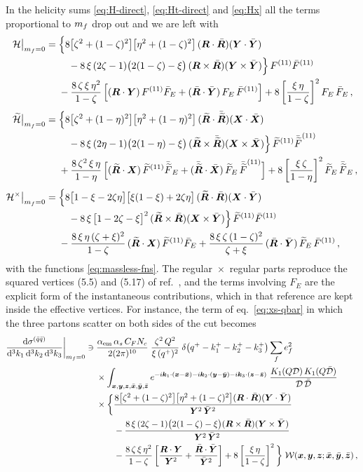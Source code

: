 In the helicity sums \eqref{eq:H-direct}, \eqref{eq:Ht-direct} and \eqref{eq:Hx} all the terms
proportional to $m_f$ drop out and we are left with
\begin{align}
\mathcal{H}\big|_{m_f=0}={}&\Big\{8\big[\zeta^2+(1-\zeta)^2\big]\big[\eta^2+(1-\zeta)^2\big]\,(\bm{R}\cdot\bar{\bm{R}})(\bm{Y}\cdot\bar{\bm{Y}})
\nonumber\\
&\quad-8\,\xi\,(2\zeta-1)\big(2(1-\zeta)-\xi\big)\,(\bm{R}\times\bar{\bm{R}})(\bm{Y}\times\bar{\bm{Y}})\Big\}\,F^{(11)}\bar F^{(11)}
\nonumber\\
&-\frac{8\,\zeta\,\xi\,\eta^2}{1-\zeta}\,\Big[(\bm{R}\cdot\bm{Y})\,F^{(11)}\bar F_E+(\bar{\bm{R}}\cdot\bar{\bm{Y}})\,F_E\,\bar F^{(11)}\Big]
+8\left[\frac{\xi\,\eta}{1-\zeta}\right]^2F_E\,\bar F_E\,,
\nonumber\\[1mm]
\widetilde{\mathcal{H}}\big|_{m_f=0}={}&\Big\{8\big[\zeta^2+(1-\eta)^2\big]\big[\eta^2+(1-\eta)^2\big]\,(\widetilde{\bm{R}}\cdot\bar{\widetilde{\bm{R}}})(\bm{X}\cdot\bar{\bm{X}})
\nonumber\\
&\quad-8\,\xi\,(2\eta-1)\big(2(1-\eta)-\xi\big)\,(\widetilde{\bm{R}}\times\bar{\widetilde{\bm{R}}})(\bm{X}\times\bar{\bm{X}})\Big\}\,\widetilde{F}^{(11)}\bar{\widetilde{F}}^{(11)}
\nonumber\\
&+\frac{8\,\zeta^2\,\xi\,\eta}{1-\eta}\,\Big[(\widetilde{\bm{R}}\cdot\bm{X})\,\widetilde{F}^{(11)}\bar{\widetilde{F}}_E+(\bar{\widetilde{\bm{R}}}\cdot\bar{\bm{X}})\,\widetilde{F}_E\,\bar{\widetilde{F}}^{(11)}\Big]
+8\left[\frac{\xi\,\zeta}{1-\eta}\right]^2\widetilde{F}_E\,\bar{\widetilde{F}}_E\,,
\nonumber\\[1mm]
\mathcal{H}^\times\big|_{m_f=0}={}&\Big\{8\big[1-\xi-2\zeta\eta\big]\big[\xi(1-\xi)+2\zeta\eta\big]\,(\widetilde{\bm{R}}\cdot\bar{\bm{R}})(\bm{X}\cdot\bar{\bm{Y}})
\nonumber\\
&\quad-8\,\xi\,\big[1-2\zeta-\xi\big]^2\,(\widetilde{\bm{R}}\times\bar{\bm{R}})(\bm{X}\times\bar{\bm{Y}})\Big\}\,\widetilde{F}^{(11)}\bar F^{(11)}
\nonumber\\
&-\frac{8\,\xi\,\eta\,(\zeta+\xi)^2}{1-\zeta}\,(\widetilde{\bm{R}}\cdot\bm{X})\,\widetilde{F}^{(11)}\bar F_E
+\frac{8\,\xi\,\zeta\,(1-\zeta)^2}{\zeta+\xi}\,(\bar{\bm{R}}\cdot\bar{\bm{Y}})\,\widetilde{F}_E\,\bar F^{(11)}\,,
\label{eq:H-massless}
\end{align}
with the functions \eqref{eq:massless-fns}. The regular~$\times$~regular parts reproduce the squared
vertices (5.5) and (5.17) of ref.~\cite{Iancu:2022gpw}, and the terms involving $F_E$ are the explicit
form of the instantaneous contributions, which in that reference are kept inside the effective
vertices. For instance, the term of eq.~\eqref{eq:xs-qbar} in which the three partons scatter on both
sides of the cut becomes
\begin{align}
\frac{{\rm d}\sigma^{(\bar q\bar q)}}{{\rm d}^3k_1\,{\rm d}^3k_2\,{\rm d}^3k_3}\bigg|_{m_f=0}\ni{}&
\frac{\alpha_{\rm em}\,\alpha_s\,C_FN_c}{2(2\pi)^{10}}\;\frac{\zeta^2\,Q^2}{\xi\,(q^+)^2}\;
\delta\big(q^+-k_1^+-k_2^+-k_3^+\big)\sum_fe_f^2
\nonumber\\
&\times\int_{\bm{x},\bm{y},\bm{z},\bar{\bm{x}},\bar{\bm{y}},\bar{\bm{z}}}e^{-i\bm{k}_1\cdot(\bm{x}-\bar{\bm{x}})-i\bm{k}_2\cdot(\bm{y}-\bar{\bm{y}})-i\bm{k}_3\cdot(\bm{z}-\bar{\bm{z}})}\;
\frac{K_1(Q\mathcal{D})\,K_1(Q\bar{\mathcal{D}})}{\mathcal{D}\,\bar{\mathcal{D}}}
\nonumber\\
&\times\bigg\{\frac{8\big[\zeta^2+(1-\zeta)^2\big]\big[\eta^2+(1-\zeta)^2\big](\bm{R}\cdot\bar{\bm{R}})(\bm{Y}\cdot\bar{\bm{Y}})}{\bm{Y}^2\,\bar{\bm{Y}}^2}
\nonumber\\
&\qquad-\frac{8\,\xi\,(2\zeta-1)\big(2(1-\zeta)-\xi\big)(\bm{R}\times\bar{\bm{R}})(\bm{Y}\times\bar{\bm{Y}})}{\bm{Y}^2\,\bar{\bm{Y}}^2}
\nonumber\\
&\qquad-\frac{8\,\zeta\,\xi\,\eta^2}{1-\zeta}\left[\frac{\bm{R}\cdot\bm{Y}}{\bm{Y}^2}+\frac{\bar{\bm{R}}\cdot\bar{\bm{Y}}}{\bar{\bm{Y}}^2}\right]
+8\left[\frac{\xi\,\eta}{1-\zeta}\right]^2\bigg\}\;\mathcal{W}(\bm{x},\bm{y},\bm{z};\bar{\bm{x}},\bar{\bm{y}},\bar{\bm{z}})\,,
\end{align}
